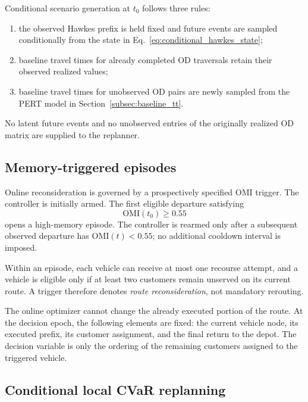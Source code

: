 \documentclass[preprint,12pt]{elsarticle}
\newcommand{\1}{\mathbf{1}}
\begin{document}
Conditional scenario generation at $t_0$ follows three rules:
\begin{enumerate}
	\item the observed Hawkes prefix is held fixed and future events are sampled
	conditionally from the state in
	Eq.~\eqref{eq:conditional_hawkes_state};
	
	\item baseline travel times for already completed OD traversals retain their
	observed realized values;
	
	\item baseline travel times for unobserved OD pairs are newly sampled from
	the PERT model in Section~\ref{subsec:baseline_tt}.
\end{enumerate}
No latent future events and no unobserved entries of the originally realized OD
matrix are supplied to the replanner.

\subsection{Memory-triggered episodes}
\label{subsec:trigger}

Online reconsideration is governed by a prospectively specified OMI trigger.
The controller is initially armed. The first eligible departure satisfying
\begin{equation}
	\mathrm{OMI}(t_0)\ge0.55
	\label{eq:omi_trigger}
\end{equation}
opens a high-memory episode.
The controller is rearmed only after a subsequent observed departure has
$\mathrm{OMI}(t)<0.55$; no additional cooldown interval is imposed.

Within an episode, each vehicle can receive at most one recourse attempt, and a
vehicle is eligible only if at least two customers remain unserved on its
current route. A trigger therefore denotes \emph{route reconsideration}, not
mandatory rerouting.

The online optimizer cannot change the already executed portion of the route.
At the decision epoch, the following elements are fixed:
the current vehicle node, its executed prefix, its customer assignment, and the
final return to the depot. The decision variable is only the ordering of the
remaining customers assigned to the triggered vehicle.

\subsection{Conditional local CVaR replanning}
\label{subsec:conditional_replanning}
\end{document}
